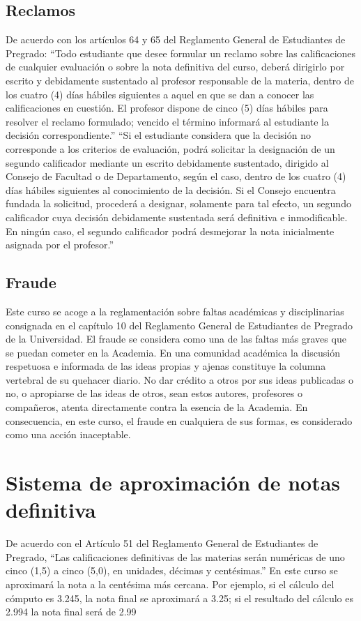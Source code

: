 \documentclass[11pt]{article}
\begin{document}
\subsection*{Reclamos}

De acuerdo con los artículos 64 y 65 del Reglamento General de Estudiantes de Pregrado:
“Todo estudiante que desee formular un reclamo sobre las calificaciones de cualquier evaluación o sobre la nota definitiva del curso, deberá dirigirlo por escrito y debidamente sustentado al profesor responsable de la materia, dentro de los cuatro (4) días hábiles siguientes a aquel en que se dan a conocer las calificaciones en cuestión. El profesor dispone de cinco (5) días hábiles para resolver el reclamo formulado; vencido el término informará al estudiante la decisión correspondiente.”
“Si el estudiante considera que la decisión no corresponde a los criterios de evaluación, podrá solicitar la designación de un segundo calificador mediante un escrito debidamente sustentado, dirigido al Consejo de Facultad o de Departamento, según el caso, dentro de los cuatro (4) días hábiles siguientes al conocimiento de la decisión. Si el Consejo encuentra fundada la solicitud, procederá a designar, solamente para tal efecto, un segundo calificador cuya decisión debidamente sustentada será definitiva e inmodificable. En ningún caso, el segundo calificador podrá desmejorar la nota inicialmente asignada por el profesor.”

\subsection*{Fraude}
Este curso se acoge a la reglamentación sobre faltas académicas y disciplinarias consignada en el capítulo 10 del Reglamento General de Estudiantes de Pregrado de la Universidad.
El fraude se considera como una de las faltas más graves que se puedan cometer en la Academia. En una comunidad académica la discusión respetuosa e informada de las ideas propias y ajenas constituye la columna vertebral de su quehacer diario. No dar crédito a otros por sus ideas publicadas o no, o apropiarse de las ideas de otros, sean estos autores, profesores o compañeros, atenta directamente contra la esencia de la Academia. En consecuencia, en este curso, el fraude en cualquiera de sus formas, es considerado como una acción inaceptable.


\section{Sistema de aproximación de notas definitiva}
De acuerdo con el Artículo 51 del Reglamento General de Estudiantes de Pregrado, “Las calificaciones definitivas de las materias serán numéricas de uno cinco (1,5) a cinco (5,0), en unidades, décimas y centésimas.”
En este curso se aproximará la nota a la centésima más cercana. Por ejemplo, si el cálculo del cómputo es 3.245, la nota final se aproximará a 3.25; si el resultado del cálculo es 2.994 la nota final será de 2.99
\end{document}
